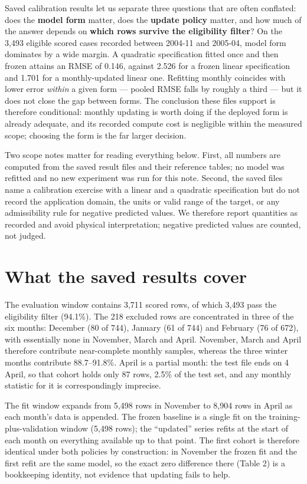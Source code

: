 Saved calibration results let us separate three questions that are often
conflated: does the \textbf{model form} matter, does the \textbf{update
policy} matter, and how much of the answer depends on \textbf{which rows
survive the eligibility filter}? On the 3,493 eligible scored cases
recorded between 2004-11 and 2005-04, model form dominates by a wide
margin. A quadratic specification fitted once and then frozen attains an
RMSE of 0.146, against 2.526 for a frozen linear specification and 1.701
for a monthly-updated linear one. Refitting monthly coincides with lower
error \emph{within} a given form --- pooled RMSE falls by roughly a
third --- but it does not close the gap between forms. The conclusion
these files support is therefore conditional: monthly updating is worth
doing if the deployed form is already adequate, and its recorded compute
cost is negligible within the measured scope; choosing the form is the
far larger decision.

Two scope notes matter for reading everything below. First, all numbers
are computed from the saved result files and their reference tables; no
model was refitted and no new experiment was run for this note. Second,
the saved files name a calibration exercise with a linear and a
quadratic specification but do not record the application domain, the
units or valid range of the target, or any admissibility rule for
negative predicted values. We therefore report quantities as recorded
and avoid physical interpretation; negative predicted values are
counted, not judged.

\hypertarget{what-the-saved-results-cover}{%
\section{What the saved results
cover}\label{what-the-saved-results-cover}}

The evaluation window contains 3,711 scored rows, of which 3,493 pass
the eligibility filter (94.1\%). The 218 excluded rows are concentrated
in three of the six months: December (80 of 744), January (61 of 744)
and February (76 of 672), with essentially none in November, March and
April. November, March and April therefore contribute near-complete
monthly samples, whereas the three winter months contribute
88.7--91.8\%. April is a partial month: the test file ends on 4 April,
so that cohort holds only 87 rows, 2.5\% of the test set, and any
monthly statistic for it is correspondingly imprecise.

The fit window expands from 5,498 rows in November to 8,904 rows in
April as each month's data is appended. The frozen baseline is a single
fit on the training-plus-validation window (5,498 rows); the ``updated''
series refits at the start of each month on everything available up to
that point. The first cohort is therefore identical under both policies
by construction: in November the frozen fit and the first refit are the
same model, so the exact zero difference there (Table 2) is a
bookkeeping identity, not evidence that updating fails to help.

